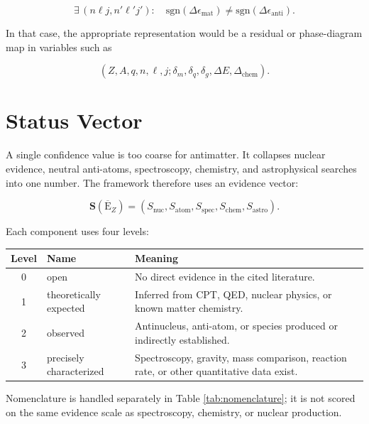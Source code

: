\documentclass[11pt,a4paper]{article}
\newcommand{\antiE}{\ensuremath{\overline{\mathrm{E}}}}
\begin{document}
\begin{equation}
\exists\,(n\ell j,n'\ell'j'):
\quad
\mathrm{sgn}(\Delta\epsilon_{\mathrm{mat}})
\neq
\mathrm{sgn}(\Delta\epsilon_{\mathrm{anti}}) .
\end{equation}

In that case, the appropriate representation would be a residual or phase-diagram map in variables such as

\begin{equation}
(Z,A,q,n,\ell,j;\delta_m,\delta_q,\delta_g,\Delta E,\Delta_{\mathrm{chem}}).
\end{equation}

\section{Status Vector}
\label{sec:status-vector}

A single confidence value is too coarse for antimatter. It collapses nuclear evidence, neutral anti-atoms, spectroscopy, chemistry, and astrophysical searches into one number. The framework therefore uses an evidence vector:

\begin{equation}
\mathbf{S}(\antiE_Z)=
\left(
S_{\mathrm{nuc}},
S_{\mathrm{atom}},
S_{\mathrm{spec}},
S_{\mathrm{chem}},
S_{\mathrm{astro}}
\right).
\end{equation}

Each component uses four levels:

\begin{center}
\begin{tabular}{clp{}}
\toprule
\textbf{Level} & \textbf{Name} & \textbf{Meaning}\\
\midrule
0 & open & No direct evidence in the cited literature.\\
1 & theoretically expected & Inferred from CPT, QED, nuclear physics, or known matter chemistry.\\
2 & observed & Antinucleus, anti-atom, or species produced or indirectly established.\\
3 & precisely characterized & Spectroscopy, gravity, mass comparison, reaction rate, or other quantitative data exist.\\
\bottomrule
\end{tabular}
\end{center}

Nomenclature is handled separately in Table \ref{tab:nomenclature}; it is not scored on the same evidence scale as spectroscopy, chemistry, or nuclear production.
\end{document}
